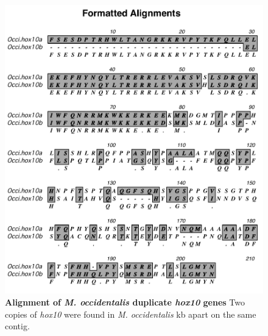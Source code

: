 \begin{figure}[tbp]
\centering
\includegraphics[scale=0.95]{figures/Occi_hox10.pdf}
\caption{\textbf{Alignment of \textit{M. occidentalis} duplicate \textit{hox10} genes} Two copies of \textit{hox10} were found in \textit{M. occidentalis}  kb apart on the same contig.}
\label{fig:occihox10}
\end{figure}